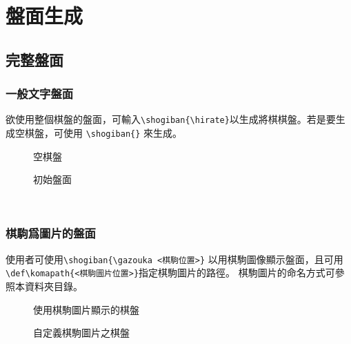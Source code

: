 \section{盤面生成}

\subsection{完整盤面}
\subsubsection{一般文字盤面}
欲使用整個棋盤的盤面，可輸入\verb|\shogiban{\hirate}|以生成將棋棋盤。若是要生成空棋盤，可使用 \verb|\shogiban{}| 來生成。\\
\begin{figure}[h]
  \begin{minipage}[h]{0.5\linewidth}
    \centering
    \shogiban{}
    \caption{空棋盤}
    \label{fig:side:a}
  \end{minipage}%
  \begin{minipage}[h]{0.5\linewidth}
    \centering
    \shogiban{\hirate}
    \caption{初始盤面}
    \label{fig:side:b}
  \end{minipage}
\end{figure}\\
\subsubsection{棋駒爲圖片的盤面}

使用者可使用\verb|\shogiban{\gazouka <棋駒位置>}| 以用棋駒圖像顯示盤面，且可用\verb|\def\komapath{<棋駒圖片位置>}|指定棋駒圖片的路徑。
棋駒圖片的命名方式可參照本資料夾目錄。
\begin{figure}[h]
  \begin{minipage}[h]{0.5\linewidth}
    \centering
    
    \caption{使用棋駒圖片顯示的棋盤}
    \label{fig:side:a}
  \end{minipage}%
  \begin{minipage}[h]{0.5\linewidth}
    \centering
    \def\komapath{Portella}
  \gazouka
    \caption{自定義棋駒圖片之棋盤}
    \label{fig:side:b}
  \end{minipage}
\end{figure}
